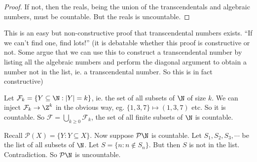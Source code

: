 \documentclass[a4paper]{article}
\begin{document}
\begin{proof}
  If not, then the reals, being the union of the transcendentals and algebraic numbers, must be countable. But the reals is uncountable.
\end{proof}
This is an easy but non-constructive proof that transcendental numbers exists. ``If we can't find one, find lots!'' (it is debatable whether this proof is constructive or not. Some argue that we can use this to construct a transcendental number by listing all the algebraic numbers and perform the diagonal argument to obtain a number not in the list, ie. a transcendental number. So this is in fact constructive)

\begin{eg}
  Let $\mathcal{F}_k = \{Y\subseteq \N: |Y| = k\}$, ie. the set of all subsets of $\N$ of size $k$. We can inject $\mathcal{F}_k \to \Z^k$ in the obvious way, eg. $\{1, 3, 7\}\mapsto (1, 3, 7)$ etc. So it is countable. So $\mathcal{F} = \bigcup_{k\geq 0}\mathcal{F}_k$, the set of all finite subsets of $\N$ is countable.
\end{eg}

\begin{eg}
  Recall $\mathcal{P}(X) = \{Y: Y\subseteq X\}$. Now suppose $\mathcal{P}\N$ is countable. Let $S_1,S_2,S_3, \cdots$ be the list of all subsets of $\N$. Let $S = \{n: n\not\in S_n\}$. But then $S$ is not in the list. Contradiction. So $\mathcal{P}\N$ is uncountable.
\end{eg}
\end{document}
